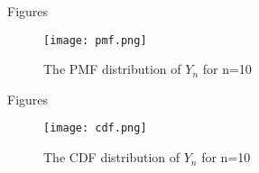 \documentclass{beamer}
\begin{document}
\begin{frame}{Figures}
\begin{figure}[!ht]
\centering
\texttt{[image: pmf.png]}
\caption{The PMF distribution of $Y_n$ for n=10}
\label{rect}
\end{figure}
\end{frame}
\begin{frame}{Figures}
\begin{figure}[!ht]
\centering
\texttt{[image: cdf.png]}
\caption{The CDF distribution of $Y_n$ for n=10}
\label{rect}
\end{figure}
\end{frame}
\end{document}
